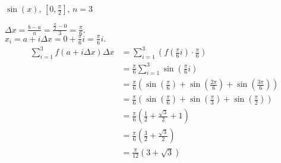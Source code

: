 \documentclass[handout, nooutcomes]{ximera}
\renewenvironment{freeResponse}{
\ifhandout\setbox0\vbox\bgroup\else
\begin{trivlist}\item[\hskip \labelsep\bfseries Solution:\hspace{2ex}]
\fi}
{\ifhandout\egroup\else
\end{trivlist}
\fi}
\begin{document}
\begin{problem}
\begin{enumerate}
	\item  $\sin (x)$, \; $\left[ 0, \frac{\pi}{2} \right]$, \; $n=3$
		\begin{freeResponse}
		$\Delta x=\frac{b-a}{n}=\frac{\frac{\pi }{2}-0}{3}=\frac{\pi }{6}$.  \\
		$x_i=a+i\Delta x=0+\frac{\pi }{6}i=\frac{\pi }{6}i.$
		\begin{align*}
		\sum_{i=1}^{3}  f ( a + i \Delta x ) \Delta x  &= \sum_{i=1}^{3} \left( f \left( \frac{\pi}{6}i \right) \cdot \frac{\pi}{6} \right) \\
		&= \frac{\pi}{6} \sum_{i=1}^{3} \sin \left( \frac{\pi}{6} i \right) \\
		&= \frac{\pi}{6} \left( \sin \left( \frac{\pi}{6} \right) + \sin \left( \frac{2 \pi}{6} \right) + \sin \left( \frac{3 \pi}{6} \right) \right) \\
		&= \frac{\pi}{6} \left( \sin \left( \frac{\pi}{6} \right) + \sin \left( \frac{\pi}{3} \right) + \sin \left( \frac{\pi}{2} \right) \right) \\
		&= \frac{\pi}{6} \left( \frac{1}{2} + \frac{\sqrt{3}}{2} + 1 \right)  \\
		&= \frac{\pi}{6} \left( \frac{3}{2} + \frac{\sqrt{3}}{2} \right)  \\
		&= \frac{\pi}{12} (3 + \sqrt{3} )
		\end{align*}
		\end{freeResponse}
		
		
		
	\end{enumerate}
		
		
		

\end{problem}
	
	
	
	
	
	
	
	
			
			






	
	
	
	
	
	
	
	
	

	










								
				
\end{document}
